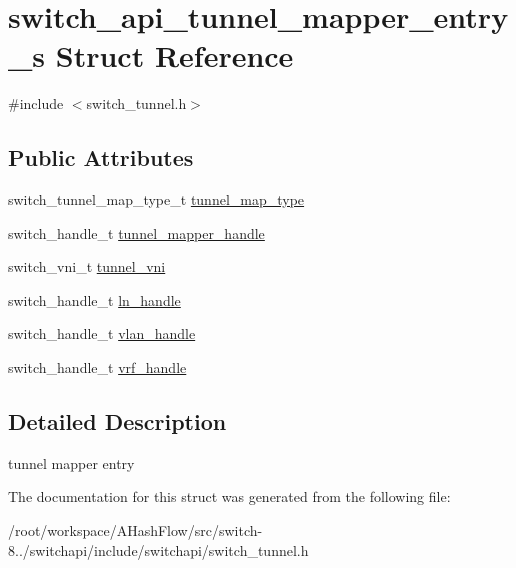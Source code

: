 \hypertarget{structswitch__api__tunnel__mapper__entry__s}{\section{switch\+\_\+api\+\_\+tunnel\+\_\+mapper\+\_\+entry\+\_\+s Struct Reference}
\label{structswitch__api__tunnel__mapper__entry__s}
}


{\ttfamily \#include $<$switch\+\_\+tunnel.\+h$>$}

\subsection*{Public Attributes}
\begin{DoxyCompactItemize}
\item 
switch\+\_\+tunnel\+\_\+map\+\_\+type\+\_\+t \hyperlink{group__Tunnel_ga64713ea1034e8583ee43f1d811e03eba}{tunnel\+\_\+map\+\_\+type}
\item 
switch\+\_\+handle\+\_\+t \hyperlink{group__Tunnel_ga57c05fa2b7375ae67c1ec2c14e44b4c6}{tunnel\+\_\+mapper\+\_\+handle}
\item 
switch\+\_\+vni\+\_\+t \hyperlink{group__Tunnel_ga6df67b78ae859af0bd8c54bffe5a25a6}{tunnel\+\_\+vni}
\item 
switch\+\_\+handle\+\_\+t \hyperlink{group__Tunnel_gafbb8e8e313ad0a67bc337a6a29878a7c}{ln\+\_\+handle}
\item 
switch\+\_\+handle\+\_\+t \hyperlink{group__Tunnel_ga15e98ca4e3a4039ada5611919b7b6a53}{vlan\+\_\+handle}
\item 
switch\+\_\+handle\+\_\+t \hyperlink{group__Tunnel_ga394a19941f2d37aa9e323044f18e349b}{vrf\+\_\+handle}
\end{DoxyCompactItemize}


\subsection{Detailed Description}
tunnel mapper entry 

The documentation for this struct was generated from the following file\+:\begin{DoxyCompactItemize}
\item 
/root/workspace/\+A\+Hash\+Flow/src/switch-\/8../switchapi/include/switchapi/switch\+\_\+tunnel.\+h\end{DoxyCompactItemize}
